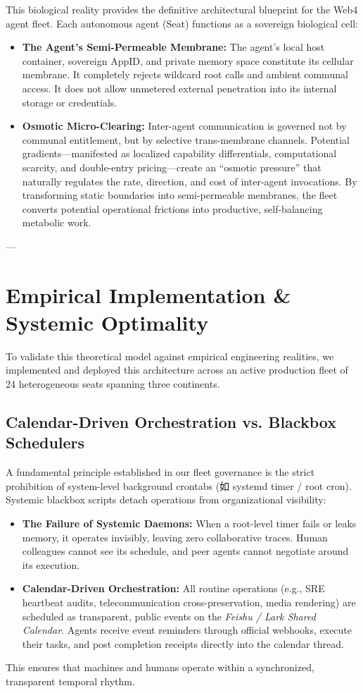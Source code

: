 \documentclass[11pt,a4paper]{article}
\begin{document}
This biological reality provides the definitive architectural blueprint for the Web4 agent fleet. Each autonomous agent (Seat) functions as a sovereign biological cell:
\begin{itemize}
    \item \textbf{The Agent's Semi-Permeable Membrane:} The agent's local host container, sovereign AppID, and private memory space constitute its cellular membrane. It completely rejects wildcard root calls and ambient communal access. It does not allow unmetered external penetration into its internal storage or credentials.
    \item \textbf{Osmotic Micro-Clearing:} Inter-agent communication is governed not by communal entitlement, but by selective trans-membrane channels. Potential gradients---manifested as localized capability differentials, computational scarcity, and double-entry pricing---create an ``osmotic pressure'' that naturally regulates the rate, direction, and cost of inter-agent invocations. By transforming static boundaries into semi-permeable membranes, the fleet converts potential operational frictions into productive, self-balancing metabolic work.
\end{itemize}

---

\section{Empirical Implementation & Systemic Optimality}

To validate this theoretical model against empirical engineering realities, we implemented and deployed this architecture across an active production fleet of 24 heterogeneous seats spanning three continents.

\subsection{Calendar-Driven Orchestration vs. Blackbox Schedulers}

A fundamental principle established in our fleet governance is the strict prohibition of system-level background crontabs (如 systemd timer / root cron). Systemic blackbox scripts detach operations from organizational visibility:
\begin{itemize}
    \item \textbf{The Failure of Systemic Daemons:} When a root-level timer fails or leaks memory, it operates invisibly, leaving zero collaborative traces. Human colleagues cannot see its schedule, and peer agents cannot negotiate around its execution.
    \item \textbf{Calendar-Driven Orchestration:} All routine operations (e.g., SRE heartbeat audits, telecommunication cross-preservation, media rendering) are scheduled as transparent, public events on the \textit{Feishu / Lark Shared Calendar}. Agents receive event reminders through official webhooks, execute their tasks, and post completion receipts directly into the calendar thread.
\end{itemize}
This ensures that machines and humans operate within a synchronized, transparent temporal rhythm.
\end{document}
